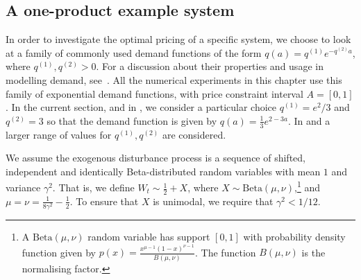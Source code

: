 \documentclass[main.tex]{subfiles}
\begin{document}
\subsection{A one-product example system}\label{subsec:bellman_example_markdown}
In order to investigate the optimal pricing of a specific system, we
choose to look at a family of commonly used demand functions of the form
$q(a)=q^{(1)}e^{-q^{(2)}a}$, where $q^{(1)},q^{(2)}>0$. For a discussion
about their properties and usage in modelling demand, see~\citet[Ch.~7]{talluri2006theory}.
All the numerical experiments in this chapter use this family of exponential
demand functions, with price constraint interval $A=[0,1]$.
In the current section, and in
,
we consider a particular choice  $q^{(1)}=e^2/3$ and $q^{(2)}=3$ so that the demand
function is given by $q(a)=\frac{1}{3}e^{2-3a}$.
In  and  a larger
range of values for $q^{(1)},q^{(2)}$ are considered.

We assume the exogenous disturbance process is a sequence of
shifted, independent and identically Beta-distributed random
variables with mean $1$ and variance
$\gamma^2$. That is, we define $W_t\sim \frac{1}{2}+X$, where
$X\sim \mathrm{Beta}(\mu,\nu)$,\footnote{A
  $\mathrm{Beta}(\mu,\nu)$ random variable has support $[0,1]$ with
  probability density function given by
  $p(x)=\frac{x^{\mu-1}{(1-x)}^{\nu-1}}{B(\mu,\nu)}$.
  The function $B(\mu,\nu)$ is the normalising factor.
}
and $\mu=\nu=\frac{1}{8\gamma^2}-\frac{1}{2}$.
To ensure that $X$ is unimodal, we require that $\gamma^2<1/12$.
\end{document}
